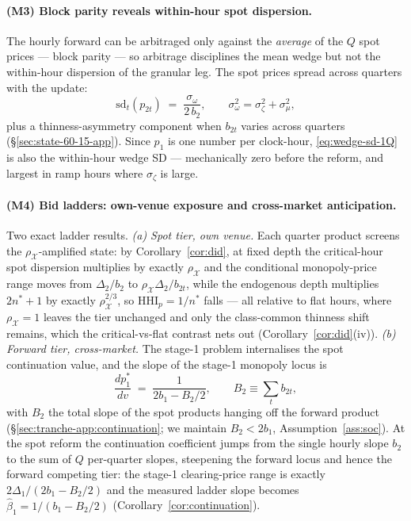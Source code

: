 \documentclass[11pt,a4paper]{article}
\theoremstyle{definition}
\theoremstyle{remark}
\theoremstyle{plain}
\begin{document}
\paragraph{(M3) Block parity reveals within-hour spot dispersion.} The hourly forward can be arbitraged only against the \emph{average} of the $Q$ spot prices --- block parity --- so arbitrage disciplines the mean wedge but not the within-hour dispersion of the granular leg. The spot prices spread across quarters with the update:
\begin{equation}
\boxed{\;\mathrm{sd}_t(p_{2t}) \;=\; \frac{\sigma_\omega}{2\, b_2}, \qquad \sigma_\omega^2 = \sigma_\zeta^2 + \sigma_\mu^2,\;}
\label{eq:wedge-sd-1Q}
\end{equation}
plus a thinness-asymmetry component when $b_{2t}$ varies across quarters (\S\ref{sec:state-60-15-app}). Since $p_1$ is one number per clock-hour, \eqref{eq:wedge-sd-1Q} is also the within-hour wedge SD --- mechanically zero before the reform, and largest in ramp hours where $\sigma_\zeta$ is large.

\paragraph{(M4) Bid ladders: own-venue exposure and cross-market anticipation.} Two exact ladder results. \emph{(a) Spot tier, own venue.} Each quarter product screens the $\rho_{\mathcal X}$-amplified state: by Corollary~\ref{cor:did}, at fixed depth the critical-hour spot dispersion multiplies by exactly $\rho_{\mathcal X}$ and the conditional monopoly-price range moves from $\Delta_2/b_2$ to $\rho_{\mathcal X}\Delta_2/b_{2t}$, while the endogenous depth multiplies $2n^*+1$ by exactly $\rho_{\mathcal X}^{2/3}$, so $\text{HHI}_p = 1/n^*$ falls --- all relative to flat hours, where $\rho_{\mathcal X} = 1$ leaves the tier unchanged and only the class-common thinness shift remains, which the critical-vs-flat contrast nets out (Corollary~\ref{cor:did}(iv)). \emph{(b) Forward tier, cross-market.} The stage-1 problem internalises the spot continuation value, and the slope of the stage-1 monopoly locus is
\begin{equation}
\boxed{\;\frac{d p_1^*}{d v} \;=\; \frac{1}{2 b_1 - B_2/2}, \qquad B_2 \equiv \sum_{t} b_{2t},\;}
\label{eq:locus-slope}
\end{equation}
with $B_2$ the total slope of the spot products hanging off the forward product (\S\ref{sec:tranche-app:continuation}; we maintain $B_2 < 2 b_1$, Assumption~\ref{ass:soc}). At the spot reform the continuation coefficient jumps from the single hourly slope $b_2$ to the sum of $Q$ per-quarter slopes, steepening the forward locus and hence the forward competing tier: the stage-1 clearing-price range is exactly $2\Delta_1/(2 b_1 - B_2/2)$ and the measured ladder slope becomes $\hat\beta_1 = 1/(b_1 - B_2/2)$ (Corollary~\ref{cor:continuation}).
\end{document}
